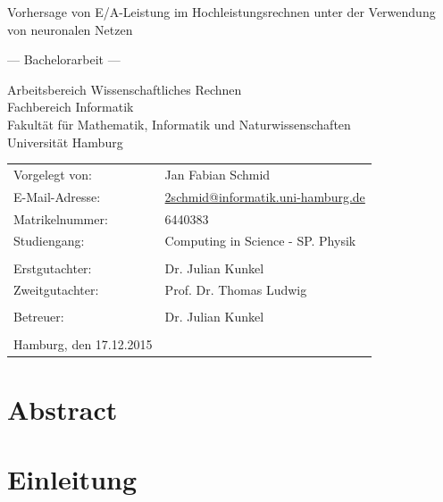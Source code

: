 \documentclass[
	12pt,
	a4paper,
	BCOR10mm,
	DIV14,
	listof=totoc,
	bibliography=totoc,
	headsepline
]{scrreprt}
\begin{document}
\begin{titlepage}
	\begin{center}
		{\titlefont\huge Vorhersage von E/A-Leistung im Hochleistungsrechnen unter der Verwendung von neuronalen Netzen\par}

		\bigskip
		\bigskip

		{\titlefont\Large --- Bachelorarbeit ---\par}

		\bigskip
		\bigskip

		{\large Arbeitsbereich Wissenschaftliches Rechnen\\
		Fachbereich Informatik\\
		Fakultät für Mathematik, Informatik und Naturwissenschaften\\
		Universität Hamburg\par}
	\end{center}

	\vfill

	{\large \begin{tabular}{ll}
		Vorgelegt von: & Jan Fabian Schmid \\
		E-Mail-Adresse: & \href{mailto:2schmid@informatik.uni-hamburg.de}{2schmid@informatik.uni-hamburg.de} \\
		Matrikelnummer: & 6440383 \\
		Studiengang: & Computing in Science - SP. Physik \\
		\\
		Erstgutachter: & Dr. Julian Kunkel \\
		Zweitgutachter: & Prof. Dr. Thomas Ludwig\\ \\
		Betreuer: & Dr. Julian Kunkel \\
		\\
		Hamburg, den 17.12.2015
	\end{tabular}\par}
\end{titlepage}

\chapter*{Abstract}

\thispagestyle{empty}


\tableofcontents

\chapter{Einleitung}
\label{Einleitung}
\end{document}
